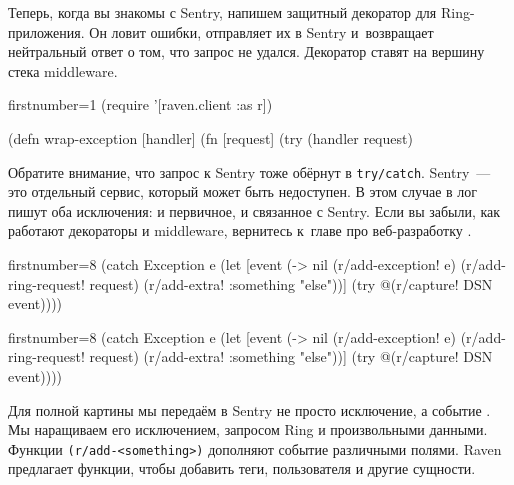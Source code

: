 
Теперь, когда вы знакомы с Sentry, напишем защитный декоратор для
Ring-приложения. Он ловит ошибки, отправляет их в Sentry и~возвращает
нейтральный ответ о том, что запрос не удался. Декоратор ставят на вершину стека
middleware.

\begin{english}
  \begin{clojure/lines*}{firstnumber=1}
(require '[raven.client :as r])

(defn wrap-exception
  [handler]
  (fn [request]
    (try
      (handler request)
  \end{clojure/lines*}
\end{english}

\wavebottom

Обратите внимание, что запрос к Sentry тоже обёрнут в \verb|try/catch|. Sentry~---
это отдельный сервис, который может быть недоступен. В этом случае в лог пишут
оба исключения: и первичное, и связанное с Sentry. Если вы забыли, как работают
декораторы и middleware, вернитесь к~главе про веб-разработку .

\wavetop

\ifx\devicetype\mobile

\begin{english}
  \begin{clojure/lines*}{firstnumber=8}
(catch Exception e
  (let [event
        (-> nil
            (r/add-exception! e)
            (r/add-ring-request!
              request)
            (r/add-extra!
              {:something "else"}))]
    (try @(r/capture! DSN event))))
  \end{clojure/lines*}
\end{english}

\else

\begin{english}
  \begin{clojure/lines*}{firstnumber=8}
      (catch Exception e
        (let [event (-> nil
                        (r/add-exception! e)
                        (r/add-ring-request! request)
                        (r/add-extra! {:something "else"}))]
          (try
            @(r/capture! DSN event))))
  \end{clojure/lines*}
\end{english}

\fi

\wavebottom

Для полной картины мы передаём в Sentry не просто исключение, а событие
. Мы наращиваем его исключением, запросом Ring и произвольными
данными. Функции \verb|(r/add-<something>)| дополняют событие различными
полями. Raven предлагает функции, чтобы добавить теги, пользователя и другие
сущности.

